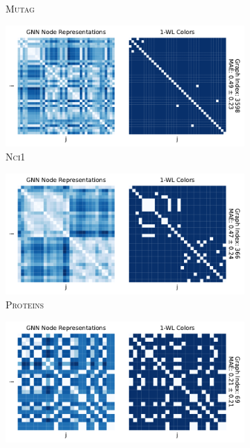 \begin{figure}[H]
\begin{subfigure}[b]{0.49\textwidth}
		\vspace*{-5ex} 
        \caption{\textsc{Mutag}}
	\end{subfigure}
	\hfill
	\begin{subfigure}[b]{0.49\textwidth}
		\centering
		\includegraphics[width=\textwidth]{Figures/heatmaps_NCI1_single.pdf}
		\vspace*{-5ex} 
        \caption{\textsc{Nci1}}
	\end{subfigure}
	\par\bigskip
	\begin{subfigure}[b]{0.49\textwidth}
		\centering
		\includegraphics[width=\textwidth]{Figures/heatmaps_PROTEINS_single.pdf}
		\vspace*{-5ex} 
        \caption{\textsc{Proteins}}
	\end{subfigure}
	\hfill
	\begin{subfigure}[b]{0.49\textwidth}
		\centering
		\includegraphics[width=\textwidth]{Figures/heatmaps_IMDB-BINARY_single.pdf}

\end{subfigure}
\end{figure}
